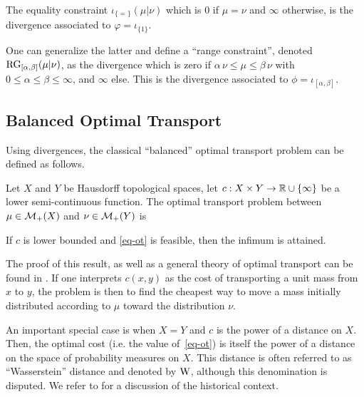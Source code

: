 %
\begin{example}
The equality constraint $\iota_{\{=\}}(\mu| \nu)$ which is $0$ if $\mu=\nu$ and $\infty$ otherwise, is the divergence associated to $\varphi=\iota_{\{1\}}$.
\end{example}
%
\begin{example}
\label{ex_RG}
One can generalize the latter and define a ``range constraint'', denoted $\operatorname{RG}_{[\alpha,\beta]}(\mu|\nu)$, as the divergence which is zero if $\alpha \, \nu \leq \mu \leq \beta \, \nu$ with $0\leq\alpha\leq\beta\leq \infty$, and $\infty$ else. This is the divergence associated to $\phi = \iota_{[\alpha, \beta]}$.
\end{example}


\subsection{Balanced Optimal Transport}
\label{subsec_balanced}

Using divergences, the classical ``balanced'' optimal transport problem can be defined as follows.

\begin{definition}
Let $X$ and $Y$ be Hausdorff topological spaces, let $c : X \times Y \rightarrow \mathbb{R} \cup \{\infty\}$ be a lower semi-continuous function. The optimal transport problem between $\mu\in \mathcal{M}_+(X)$ and $\nu\in \mathcal{M}_+(Y)$ is
\end{definition}

\begin{proposition}
If $c$ is lower bounded and \eqref{eq-ot} is feasible, then the infimum is attained.
\end{proposition}
The proof of this result, as well as  a general theory of optimal transport can be found in \cite{Villani-OptimalTransport-09}.
%
If one interprets $c(x,y)$ as the cost of transporting a unit mass from $x$ to $y$, the problem is then to find the cheapest way to move a mass initially distributed according to $\mu$ toward the distribution $\nu$.

\begin{example}
An important special case is when $X=Y$ and $c$ is the power of a distance on $X$. Then, the optimal cost (i.e. the value of~\eqref{eq-ot}) is itself the power of a distance on the space of probability measures on $X$. This distance is often referred to as ``Wasserstein'' distance and denoted by $\operatorname{W}$, although this denomination is disputed. We refer to \cite[Chap.\ 6, Bibliographical Notes]{Villani-OptimalTransport-09} for a discussion of the historical context.
\end{example}

